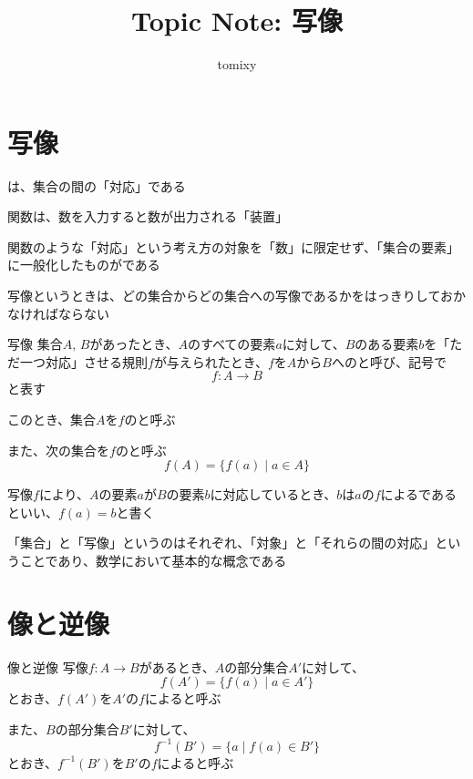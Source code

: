 \documentclass[b5paper,12pt]{jsarticle}
\title{Topic Note: 写像}
\author{tomixy}
\newcommand{\refbookA}{\refbook{ろんりと集合}}
\begin{document}
\maketitle
\tableofcontents

\sectionline
\section{写像}
\marginnote{\refbookA}

は、集合の間の「対応」である

\br

関数は、数を入力すると数が出力される「装置」

関数のような「対応」という考え方の対象を「数」に限定せず、「集合の要素」に一般化したものがである

\br

写像というときは、どの集合からどの集合への写像であるかをはっきりしておかなければならない

\begin{definition}{写像}
  集合$A, \, B$があったとき、$A$のすべての要素$a$に対して、$B$のある要素$b$を「ただ一つ対応」させる規則$f$が与えられたとき、$f$を$A$から$B$へのと呼び、記号で
  \begin{equation*}
    f\colon A \to B
  \end{equation*}
  と表す

  このとき、集合$A$を$f$のと呼ぶ

  また、次の集合を$f$のと呼ぶ
  \begin{equation*}
    f(A) = \{ f(a) \mid a \in A \}
  \end{equation*}

  写像$f$により、$A$の要素$a$が$B$の要素$b$に対応しているとき、$b$は$a$の$f$によるであるといい、$f(a) = b$と書く
\end{definition}

「集合」と「写像」というのはそれぞれ、「対象」と「それらの間の対応」ということであり、数学において基本的な概念である

\sectionline
\section{像と逆像}

\begin{definition}{像と逆像}
  写像$f\colon A \to B$があるとき、$A$の部分集合$A'$に対して、
  \begin{equation*}
    f(A') = \{ f(a) \mid a \in A' \}
  \end{equation*}
  とおき、$f(A')$を$A'$の$f$によると呼ぶ

  また、$B$の部分集合$B'$に対して、
  \begin{equation*}
    f^{-1}(B') = \{ a \mid f(a) \in B' \}
  \end{equation*}
  とおき、$f^{-1}(B')$を$B'$の$f$によると呼ぶ
\end{definition}
\end{document}
